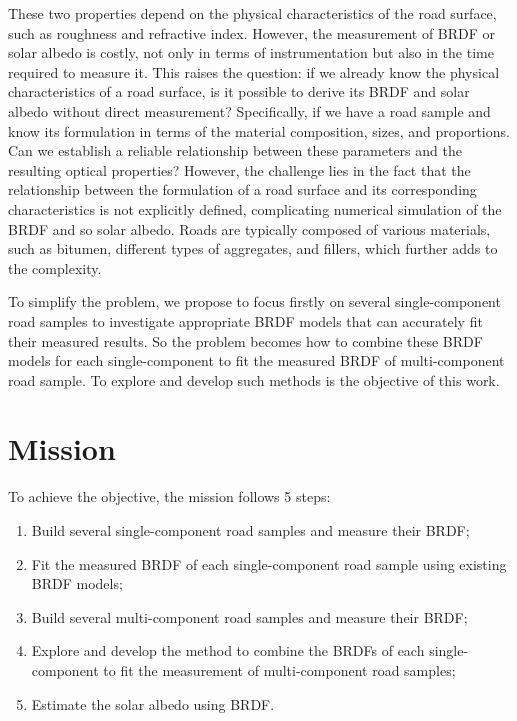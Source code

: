 These two properties depend on the physical characteristics of the road surface, such as roughness and refractive index.
However, the measurement of BRDF or solar albedo is costly, not only in terms of instrumentation but also in the time required to measure it.
This raises the question: if we already know the physical characteristics of a road surface, is it possible to derive its BRDF and solar albedo without direct measurement? 
Specifically, if we have a road sample and know its formulation in terms of the material composition, sizes, and proportions.
Can we establish a reliable relationship between these parameters and the resulting optical properties?
However, the challenge lies in the fact that the relationship between the formulation of a road surface and its corresponding characteristics is not explicitly defined, complicating numerical simulation of the BRDF and so solar albedo. 
Roads are typically composed of various materials, such as bitumen, different types of aggregates, and fillers, which further adds to the complexity.


To simplify the problem, we propose to focus firstly on several single-component road samples to investigate appropriate BRDF models that can accurately fit their measured results. 
So the problem becomes how to combine these BRDF models for each single-component to fit the measured BRDF of multi-component road sample.
To explore and develop such methods is the objective of this work.

\section{Mission}
To achieve the objective, the mission follows 5 steps:
\begin{enumerate}
    \item Build several single-component road samples and measure their BRDF;
    \item Fit the measured BRDF of each single-component road sample using existing BRDF models;
    \item Build several multi-component road samples and measure their BRDF;
    \item Explore and develop the method to combine the BRDFs of each single-component to fit the measurement of multi-component road samples;
    \item Estimate the solar albedo using BRDF.
\end{enumerate}

